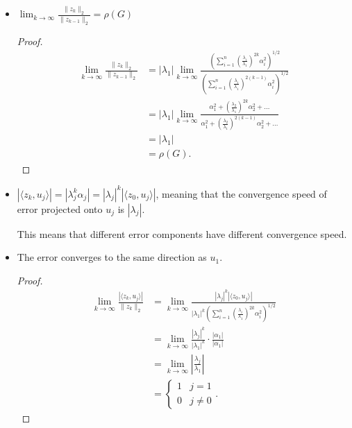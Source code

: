 \documentclass[../main/main.tex]{subfiles}
\begin{document}
\begin{itemize}
  \item $\lim_{k \to \infty} \frac{\|z_{k}\|_{2}}{\|z_{k-1}\|_{2}} = \rho(G)$
        \begin{proof}
\begin{align*}
\lim_{k \to \infty} \frac{\|z_{k}\|_{2}}{\|z_{k-1}\|_{2}} &= |\lambda_{1}| \lim_{k \to \infty} \frac{\left(\sum_{i=1}^n \left(\frac{\lambda_{i}}{\lambda_{1}} \right)^{2k}\alpha_{i}^2\right)^{ 1 / 2 }}{\left(\sum_{i=1}^n \left(\frac{\lambda_{i}}{\lambda_{1}} \right)^{2(k-1)}\alpha_{i}^2\right)^{1 /2}}
  \\ &= |\lambda_{1}| \lim_{k \to \infty} \frac{\alpha_{1}^2 + \left(\frac{\lambda_{2}}{\lambda_{1}} \right)^{2k}\alpha_{2}^2+\ldots}{\alpha_{1}^2 + \left(\frac{\lambda_{2}}{\lambda_{1}} \right)^{2(k-1)}\alpha_{2}^2+\ldots}
  \\ &= |\lambda_{1}| \\ &= \rho(G)
  .\end{align*}
        \end{proof}
        \item $|\langle z_{k}, u_{j}\rangle|  = |\lambda_{j}^{k}\alpha_{j}| = |\lambda_{j}|^{k}|\langle z_{0},u_{j}\rangle|$, meaning that the convergence speed of error projected onto $u_{j}$ is $|\lambda_{j}|$.
        \begin{remark}
This means that different error components have different convergence speed.
        \end{remark}
  \item The error converges to the same direction as $u_{1}$.
\begin{proof}
  \begin{align*}
\lim_{k \to \infty} \frac{|\langle z_{k},u_{j}\rangle|}{\|z_{k}\|_{2}} &= \lim_{k \to \infty} \frac{|\lambda_{j}|^{k}|\langle z_{0},u_{j}\rangle|}{|\lambda_{1}|^{k}\left(\sum_{i=1}^n \left(\frac{\lambda_{i}}{\lambda_{1}} \right)^{2k}\alpha_{i}^2\right)^{1 /2}} \\ &= \lim_{k \to \infty} \frac{|\lambda_{j}|^{k}}{|\lambda_{1}|^{k}} \cdot \frac{|\alpha_{1}|}{|\alpha_{1}|}\\  &= \lim_{k \to \infty} \left| \frac{\lambda_{j}}{\lambda_{1}}  \right|\\ &= \begin{cases}
    1& j=1 \\
    0& j\neq 0
  \end{cases}
    .\end{align*}
\end{proof}

\end{itemize}
\end{document}
